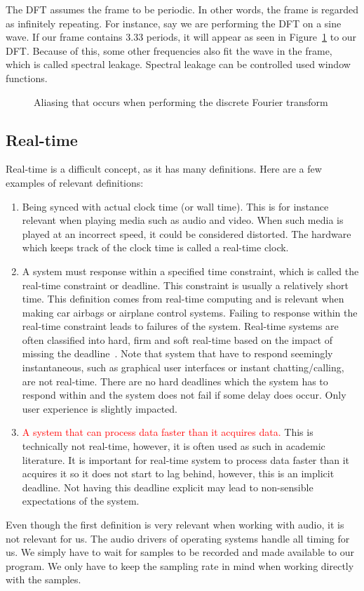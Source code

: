 \documentclass[10pt,twocolumn]{article}
\begin{document}
The DFT assumes the frame to be periodic. In other words, the frame is regarded as infinitely repeating. For instance, say we are performing the DFT on a sine wave. If our frame contains 3.33 periods, it will appear as seen in Figure~\ref{fig:framealias} to our DFT. Because of this, some other frequencies also fit the wave in the frame, which is called spectral leakage. Spectral leakage can be controlled used window functions.
\begin{figure}[H]
    \centering
    \caption{Aliasing that occurs when performing the discrete Fourier transform}
    \label{fig:framealias}
\end{figure}


\subsection{Real-time}
Real-time is a difficult concept, as it has many definitions. Here are a few examples of relevant definitions:
\begin{enumerate}
    \item Being synced with actual clock time (or wall time). This is for instance relevant when playing media such as audio and video. When such media is played at an incorrect speed, it could be considered distorted. The hardware which keeps track of the clock time is called a real-time clock.
    \item A system must response within a specified time constraint, which is called the real-time constraint or deadline. This constraint is usually a relatively short time. This definition comes from real-time computing and is relevant when making car airbags or airplane control systems. Failing to response within the real-time constraint leads to failures of the system. Real-time systems are often classified into hard, firm and soft real-time based on the impact of missing the deadline~\cite{realclass}. Note that system that have to respond seemingly instantaneous, such as graphical user interfaces or instant chatting/calling, are not real-time. There are no hard deadlines which the system has to respond within and the system does not fail if some delay does occur. Only user experience is slightly impacted.
    \item \textcolor{red}{A system that can process data faster than it acquires data.} This is technically not real-time, however, it is often used as such in academic literature. It is important for real-time system to process data faster than it acquires it so it does not start to lag behind, however, this is an implicit deadline. Not having this deadline explicit may lead to non-sensible expectations of the system.
\end{enumerate}
Even though the first definition is very relevant when working with audio, it is not relevant for us. The audio drivers of operating systems handle all timing for us. We simply have to wait for samples to be recorded and made available to our program. We only have to keep the sampling rate in mind when working directly with the samples.
\end{document}
